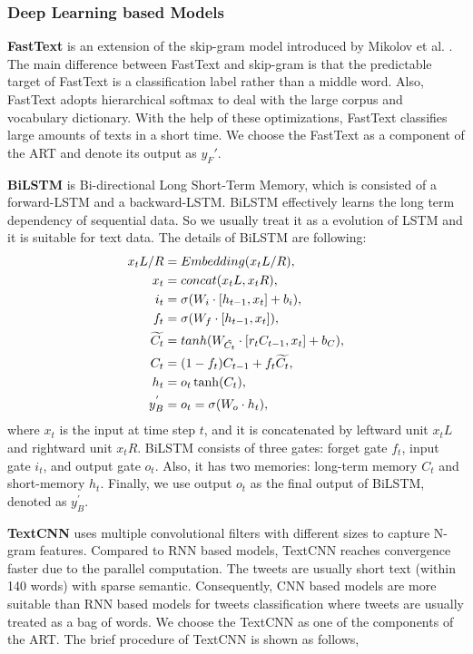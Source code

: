 \subsubsection{Deep Learning based Models}

\textbf{FastText} \cite{DBLP:journals/tacl/BojanowskiGJM17, DBLP:journals/corr/JoulinGBDJM16, DBLP:conf/eacl/GraveMJB17} is an extension of the skip-gram model introduced by Mikolov et al. \cite{DBLP:conf/nips/MikolovSCCD13}. The main difference between FastText and skip-gram is that the predictable target of FastText is a classification label rather than a middle word. Also, FastText adopts hierarchical softmax to deal with the large corpus and vocabulary dictionary. With the help of these optimizations, FastText classifies large amounts of texts in a short time. We choose the FastText as a component of the ART and denote its output as $y_F'$.

\textbf{BiLSTM} \cite{DBLP:journals/neco/HochreiterS97} is Bi-directional Long Short-Term Memory, which is consisted of a forward-LSTM and a backward-LSTM. BiLSTM effectively learns the long term dependency of sequential data. So we usually treat it as a evolution of LSTM and it is suitable for text data. The details of BiLSTM are following:
\begin{align}\label{eq:lstm}
x_tL/R &= Embedding(x_tL/R), \\
x_t &= concat(x_tL, x_tR), \\
i_t &= \sigma(W_i \cdot [h_{t-1}, x_t] + b_i),\\
f_t &= \sigma(W_f \cdot [h_{t-1}, x_t]),\\
\widetilde{C_t} &= tanh(W_{\tilde{C_t}} \cdot [r_t C_{t-1}, x_t]  + b_C),\\
C_t &= (1-f_t) C_{t-1} + f_t \widetilde{C_t},\\
h_t &=o_t \* \tanh(C_t),\\
y_B^{'} &= o_t =  \sigma(W_o \cdot h_t),
\end{align}
where $x_t$ is the input at time step $t$, and it is concatenated by leftward unit $x_tL$ and rightward unit $x_tR$. BiLSTM consists of three gates: forget gate $f_t$, input gate $i_t$, and output gate $o_t$. Also, it has two memories: long-term memory $C_t$ and short-memory $h_t$. Finally, we use output $o_t$ as the final output of BiLSTM, denoted as $y_B^{'}$.

\textbf{TextCNN} \cite{DBLP:conf/emnlp/Kim14} uses multiple convolutional filters with different sizes to capture N-gram features. Compared to RNN based models, TextCNN reaches convergence faster due to the parallel computation. The tweets are usually short text (within 140 words) with sparse semantic. Consequently, CNN based models are more suitable than RNN based models for tweets classification where tweets are usually treated as a bag of words. We choose the TextCNN as one of the components of the ART. The brief procedure of TextCNN is shown as follows,

